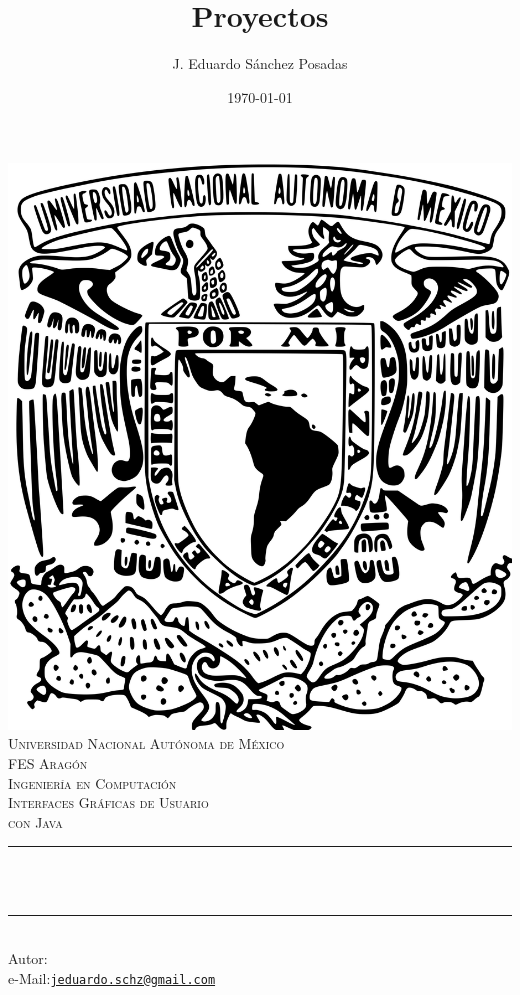 \documentclass[11pt,a4paper]{article}
\title{Proyectos}						%
\author{J. Eduardo Sánchez Posadas}					%
\date{\today}											%
\makeatletter
\let\thetitle\@title
\let\theauthor\@author
\let\thedate\@date
\makeatother
\begin{document}

\begin{titlepage}
	\centering
    \vspace*{0.5 cm}
\includegraphics[scale=0.07]{pics/escudo.png} \\[1.0 cm]  %
\textsc{\Large Universidad Nacional Autónoma de México}\\[2.0 cm] %
\textsc{\Large FES Aragón\\ Ingeniería en Computación}\\[0.5 cm] %
\textsc{\large Interfaces Gráficas de Usuario \\ con Java}\\[0.5cm] %

	\rule{\linewidth}{0.2 mm} \\[0.4 cm]
	{ \huge \bfseries \thetitle}\\
	\rule{\linewidth}{0.2 mm} \\[1.5 cm]
	 			{Autor: \large \theauthor}\\
	 			{e-Mail:\href{mailto:jeduardo.schz@gmail.com}{\texttt{jeduardo.schz@gmail.com}}}\\[0.5cm]
	{\large \thedate}\\[2 cm]
 
	\vfill
	
\end{titlepage}
\end{document}
